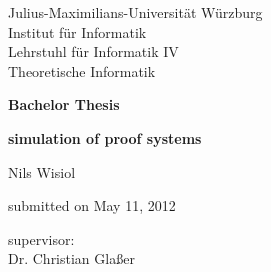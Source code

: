 \begin{titlepage}
  Julius-Maximilians-Universität Würzburg\\
  Institut für Informatik\\
  Lehrstuhl für Informatik IV\\
  Theoretische Informatik
  
  \vspace{3cm}
  
  \begin{center}
   \LARGE\textbf{Bachelor Thesis}
  \end{center}
  
  \vspace{0cm}
  
  \begin{center}
   \huge\textbf{simulation of proof systems}
  \end{center}
  
  \vspace{1cm}
  
  \begin{center}
   \Large Nils Wisiol
  \end{center}
  
  \vspace{0cm}
  
  \begin{center}
   \Large submitted on May 11, 2012
  \end{center}
  
  \vspace{5cm}
  
  \begin{center}
   \Large supervisor:\\Dr. Christian Glaßer
  \end{center}
  
  
\end{titlepage}
